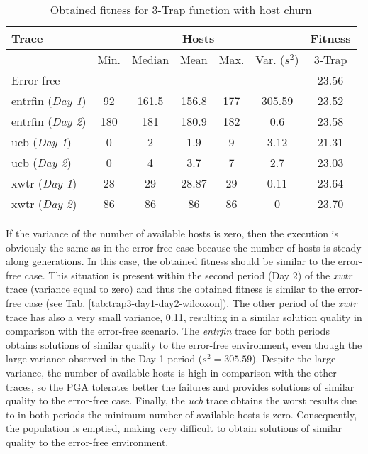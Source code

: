 \documentclass[graybox]{sty/svmult}
\begin{document}
\begin{table*}
    \caption{Obtained fitness for 3-Trap function with host churn}
\begin{center}
    \begin{footnotesize}
    \begin{tabular}{|l|c|c|c|c|c|c|}
        \hline Trace                       & \multicolumn{5}{c|}{Hosts}                                 & \multicolumn{1}{c|}{Fitness} \\     
        \hline                             & Min.    & Median & Mean   &  Max.  &  Var. ($s^2$)  &  3-Trap  \\
        \hline Error free                  & -       & -      & -      &  -     &  -             & 23.56\\ 
        \hline entrfin (\emph{Day 1})      & 92      & 161.5  &  156.8 &  177   & 305.59         & 23.52\\ 
        \hline entrfin (\emph{Day 2})      & 180     & 181    & 180.9  &  182   &  0.6           & 23.58\\ 
        \hline ucb (\emph{Day 1})          & 0       & 2      & 1.9    &  9     &  3.12          & 21.31\\ 
        \hline ucb (\emph{Day 2})          & 0       & 4      & 3.7    &  7     &  2.7           & 23.03\\ 
        \hline xwtr (\emph{Day 1})         & 28      & 29     & 28.87  &  29    &  0.11          & 23.64\\ 
        \hline xwtr (\emph{Day 2})         & 86      & 86     & 86     &  86    &  0             & 23.70\\ 
        \hline     
\end{tabular}     
\end{footnotesize}
\end{center}
\label{tab:host-churn-data}
\end{table*}

If the variance of the number of available hosts is zero, then the execution is obviously the same as in the error-free case because
the number of hosts is steady along generations. 
In this case, the obtained fitness should be similar to the error-free
case. This situation is present within the second period (Day 2) of the \emph{xwtr} trace (variance equal to zero) and thus the obtained fitness is similar to the
error-free case (see Tab. \ref{tab:trap3-day1-day2-wilcoxon}). The other period of the \emph{xwtr} trace has also a very small
variance, 0.11, resulting in a similar solution quality in comparison with the error-free scenario. The \emph{entrfin} trace for both
periods obtains solutions of similar quality to the error-free environment, even though the large variance observed in the
Day 1 period ($s^2=305.59$). Despite the large variance, the number of available hosts is high in comparison with the other
traces, so the PGA tolerates better the failures and provides solutions of similar quality to the error-free case. Finally,
the \emph{ucb} trace obtains the worst results due to in both periods the minimum number of available hosts is zero. Consequently,
the population is emptied, making very difficult to obtain solutions of similar quality to the error-free
environment. 
\end{document}

